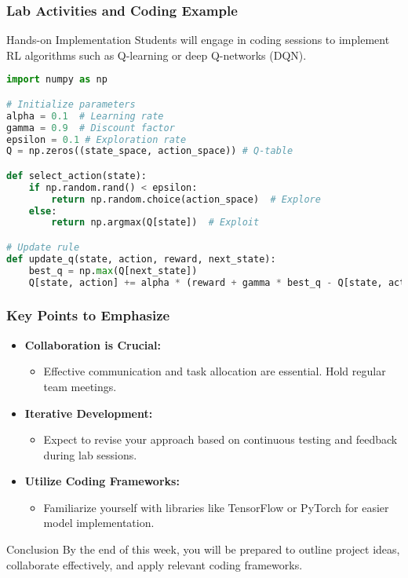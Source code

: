 \documentclass[aspectratio=169]{beamer}
\begin{document}
\begin{frame}[fragile]
    \frametitle{Lab Activities and Coding Example}
    \begin{block}{Hands-on Implementation}
        Students will engage in coding sessions to implement RL algorithms such as Q-learning or deep Q-networks (DQN).
    \end{block}
    
    \begin{lstlisting}[language=Python, caption=Example Code Snippet for Q-learning]
import numpy as np

# Initialize parameters
alpha = 0.1  # Learning rate
gamma = 0.9  # Discount factor
epsilon = 0.1 # Exploration rate
Q = np.zeros((state_space, action_space)) # Q-table

def select_action(state):
    if np.random.rand() < epsilon:
        return np.random.choice(action_space)  # Explore
    else:
        return np.argmax(Q[state])  # Exploit

# Update rule
def update_q(state, action, reward, next_state):
    best_q = np.max(Q[next_state])
    Q[state, action] += alpha * (reward + gamma * best_q - Q[state, action])
    \end{lstlisting}
\end{frame}

\begin{frame}[fragile]
    \frametitle{Key Points to Emphasize}
    \begin{itemize}
        \item \textbf{Collaboration is Crucial:}
        \begin{itemize}
            \item Effective communication and task allocation are essential. Hold regular team meetings.
        \end{itemize}
        
        \item \textbf{Iterative Development:}
        \begin{itemize}
            \item Expect to revise your approach based on continuous testing and feedback during lab sessions.
        \end{itemize}
        
        \item \textbf{Utilize Coding Frameworks:}
        \begin{itemize}
            \item Familiarize yourself with libraries like TensorFlow or PyTorch for easier model implementation.
        \end{itemize}
    \end{itemize}
    
    \begin{block}{Conclusion}
        By the end of this week, you will be prepared to outline project ideas, collaborate effectively, and apply relevant coding frameworks.
    \end{block}
\end{frame}
\end{document}
